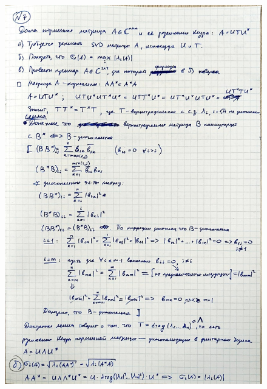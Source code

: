\documentclass{article}
\begin{document}
	\begin{figure}[h!]
		\includegraphics[width=0.95\linewidth]{handwritten/matcomp_hw1_7a}
	\end{figure}
	
\end{document}
